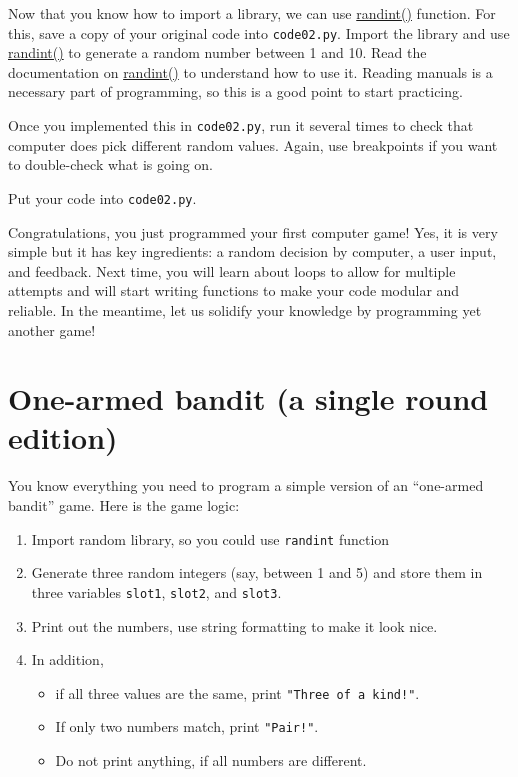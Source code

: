 \documentclass[
]{book}
\providecommand{\tightlist}{%
  \setlength{\itemsep}{0pt}\setlength{\parskip}{0pt}}
\begin{document}
Now that you know how to import a library, we can use \href{https://docs.python.org/3/library/random.html\#random.randint}{randint()} function. For this, save a copy of your original code into \texttt{code02.py}. Import the library and use \href{https://docs.python.org/3/library/random.html\#random.randint}{randint()} to generate a random number between 1 and 10. Read the documentation on \href{https://docs.python.org/3/library/random.html\#random.randint}{randint()} to understand how to use it. Reading manuals is a necessary part of programming, so this is a good point to start practicing.

Once you implemented this in \texttt{code02.py}, run it several times to check that computer does pick different random values. Again, use breakpoints if you want to double-check what is going on.

Put your code into \texttt{code02.py}.

Congratulations, you just programmed your first computer game! Yes, it is very simple but it has key ingredients: a random decision by computer, a user input, and feedback. Next time, you will learn about loops to allow for multiple attempts and will start writing functions to make your code modular and reliable. In the meantime, let us solidify your knowledge by programming yet another game!

\hypertarget{one-armed-bandit-a-single-round-edition}{%
\section{One-armed bandit (a single round edition)}\label{one-armed-bandit-a-single-round-edition}}

You know everything you need to program a simple version of an ``one-armed bandit'' game. Here is the game logic:

\begin{enumerate}
\def\labelenumi{\arabic{enumi}.}
\tightlist
\item
  Import random library, so you could use \texttt{randint} function
\item
  Generate three random integers (say, between 1 and 5) and store them in three variables \texttt{slot1}, \texttt{slot2}, and \texttt{slot3}.
\item
  Print out the numbers, use string formatting to make it look nice.
\item
  In addition,

  \begin{itemize}
  \tightlist
  \item
    if all three values are the same, print \texttt{"Three\ of\ a\ kind!"}.
  \item
    If only two numbers match, print \texttt{"Pair!"}.
  \item
    Do not print anything, if all numbers are different.
  \end{itemize}
\end{enumerate}
\end{document}
